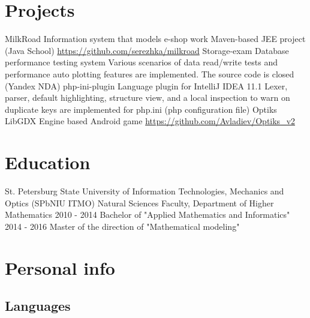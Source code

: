 \documentclass[11pt,a4paper,russian]{moderncv}
\begin{document}
\newpage

\section{Projects}
\cvline
    {MilkRoad}
    {Information system that models e-shop work \newline
    Maven-based JEE project (Java School) \newline
    \url{https://github.com/serezhka/milkroad}}
\cvline
    {Storage-exam}
    {Database performance testing system \newline 
    Various scenarios of data read/write tests and performance auto plotting  \newline
    features are implemented. The source code is closed (Yandex NDA)}
\cvline
    {php-ini-plugin}
    {Language plugin for IntelliJ IDEA 11.1 \newline
    Lexer, parser, default highlighting, structure view, and a local inspection to warn on duplicate keys are implemented for php.ini (php configuration file)}  
\cvline
    {Optiks}
    {LibGDX Engine based Android game\newline
    \url{https://github.com/Avladiev/Optiks_v2}}
  
\section{Education}
\cventry
    {}{\textnormal{St. Petersburg State University of Information Technologies, Mechanics and Optics (SPbNIU ITMO)}}
    {Natural Sciences Faculty, Department of Higher Mathematics}{}{}{}
\cvline
    {2010 - 2014}
    {Bachelor of "Applied Mathematics and Informatics"}
\cvline
    {2014 - 2016}
    {Master of the direction of "Mathematical modeling"}

\section{Personal info}

\subsection{Languages}
\end{document}
